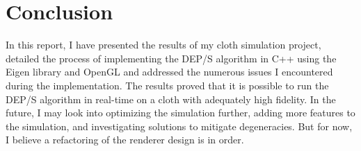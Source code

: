 \documentclass[letterpaper, 10 pt, conference]{ieeeconf}  %
\begin{document}
\section{Conclusion}

        In this report, I have presented the results of my cloth simulation project, detailed the process of implementing the DEP/S algorithm in C++ using the Eigen library and OpenGL and addressed the numerous issues I encountered during the implementation. The results proved that it is possible to run the DEP/S algorithm in real-time on a cloth with adequately high fidelity. In the future, I may look into optimizing the simulation further, adding more features to the simulation, and investigating solutions to mitigate degeneracies. But for now, I believe a refactoring of the renderer design is in order.  



\addtolength{\textheight}{-12cm}   %





\end{document}
